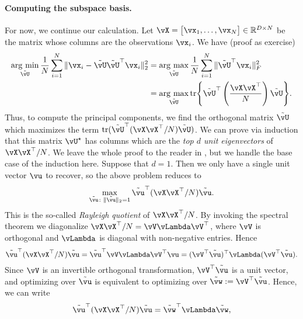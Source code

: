 \documentclass[../../book-main.tex]{subfiles}
\begin{document}
\paragraph{Computing the subspace basis.}
For now, we continue our calculation. Let \(\vX = \mat{\vx_{1}, \dots, \vx_{N}} \in \R^{D \times N}\) be the matrix whose columns are the observations \(\vx_{i}\). We have (proof as exercise)
\begin{align}
    \argmin_{\tilde{\vU}}\frac{1}{N}\sum_{i = 1}^{N}\norm{\vx_{i} - \tilde{\vU}\tilde{\vU}^{\top}\vx_{i}}_{2}^{2}
    &= \argmax_{\tilde{\vU}}\frac{1}{N}\sum_{i = 1}^{N}\norm{\tilde{\vU}^{\top}\vx_{i}}_{F}^{2} \\ 
    &= \argmax_{\tilde{\vU}}\tr\rc{\tilde{\vU}^{\top}\bp{\frac{\vX\vX^{\top}}{N}}\tilde{\vU}}.
\end{align}
Thus, to compute the principal components, we find the orthogonal matrix
\(\tilde{\vU}\) which maximizes the term
\(\tr(\tilde{\vU}^{\top}(\vX\vX^{\top}/N)\tilde{\vU})\). We can prove via
induction that this matrix \(\vU^{\star}\) has columns which are the \textit{top \(d\) unit eigenvectors} of \(\vX\vX^{\top}/N\). We leave the whole proof to the reader in , but we handle the base case of the induction here. Suppose that \(d = 1\). Then we only have a single unit vector \(\vu\) to recover, so the above problem reduces to
\begin{equation}
    \max_{\tilde{\vu} \colon \norm{\tilde{\vu}}_{2} = 1} \tilde{\vu}^{\top}(\vX\vX^{\top}/N)\tilde{\vu}.
\end{equation}
This is the so-called \textit{Rayleigh quotient} of \(\vX\vX^{\top}/N\). By invoking the spectral theorem we diagonalize \(\vX\vX^{\top}/N = \vV\vLambda\vV^{\top}\), where \(\vV\) is orthogonal and \(\vLambda\) is diagonal with non-negative entries. Hence 
\begin{equation}
    \tilde{\vu}^{\top}(\vX\vX^{\top}/N)\tilde{\vu} = \tilde{\vu}^{\top}\vV\vLambda\vV^{\top}\vu = (\vV^{\top}\tilde{\vu})^{\top}\vLambda(\vV^{\top}\tilde{\vu}).
\end{equation}
Since \(\vV\) is an invertible orthogonal transformation, \(\vV^{\top}\tilde{\vu}\) is a unit vector, and optimizing over \(\tilde{\vu}\) is equivalent to optimizing over \(\tilde{\vw} := \vV^{\top}\tilde{\vu}\). Hence, we can write
\begin{equation}
    \tilde{\vu}^{\top}(\vX\vX^{\top}/N)\tilde{\vu} = \tilde{\vw}^{\top}\vLambda\tilde{\vw},
\end{equation}
\end{document}
